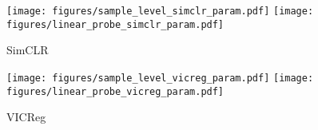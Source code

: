 \begin{figure*}[h]
     \begin{subfigure}[b]{0.49\textwidth}
         \centering
         \texttt{[image: figures/sample\_level\_simclr\_param.pdf]}
         \texttt{[image: figures/linear\_probe\_simclr\_param.pdf]}
         \caption{SimCLR}
         \label{fig:simclr temperature}
     \end{subfigure}
     \hfill
     \begin{subfigure}[b]{0.49\textwidth}
         \centering
         \texttt{[image: figures/sample\_level\_vicreg\_param.pdf]}
         \texttt{[image: figures/linear\_probe\_vicreg\_param.pdf]}
         \caption{VICReg}
         \label{fig:vicreg temperature}
     \end{subfigure}
\caption{
Effect of SSL hyperparameter on \dejavu memorization. The left plot of Figures \ref{fig:simclr temperature} and \ref{fig:vicreg temperature} show the size of the memorized set as a function of the temperature parameter for SimCLR and invariance parameter for VICReg, respectively. \Dejavu memorization is the highest within a narrow band of hyperparameters, and one can mitigate against \dejavu memorization by selecting hyperparameters outside of this band. Doing so has negligible effect on the quality of SSL embeddings as indicated by the linear probe accuracy on ImageNet validation set.
 }
\label{fig:sweep params}
\end{figure*}